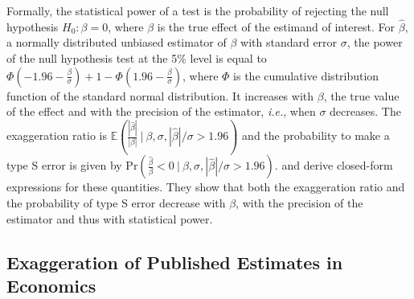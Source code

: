 \documentclass[12pt]{article}
\begin{document}
    Formally, the statistical power of a test is the probability of rejecting the null hypothesis $H_{0}: \beta = 0$, where $\beta$ is the true effect of the estimand of interest. For $\hat{\beta}$, a normally distributed unbiased estimator of $\beta$ with standard error $\sigma$, the power of the null hypothesis test at the 5\% level is equal to $\Phi\left(-1.96-\frac{\beta}{\sigma}\right)+1-\Phi\left(1.96-\frac{\beta}{\sigma}\right)$, where $\Phi$ is the cumulative distribution function of the standard normal distribution. It increases with $\beta$, the true value of the effect and with the precision of the estimator, \textit{i.e.}, when $\sigma$ decreases. The exaggeration ratio is $\mathbb{E}\left(\frac{|\hat{\beta}|}{|\beta|} \ \bigg| \ \beta, \sigma, |\hat{\beta}|/\sigma>1.96\right)$ and the probability to make a type S error is given by $\text{Pr}\left(\frac{\hat{\beta}}{\beta} < 0 \ \bigg| \ \beta, \sigma, |\hat{\beta}|/\sigma>1.96 \right)$.  \cite{zwet_significance_2021} and \cite{lu_note_2019} derive closed-form expressions for these quantities. They show that both the exaggeration ratio and the probability of type S error decrease with $\beta$, with the precision of the estimator and thus with statistical power. %

    
	\subsection{Exaggeration of Published Estimates in Economics}
	
\end{document}
